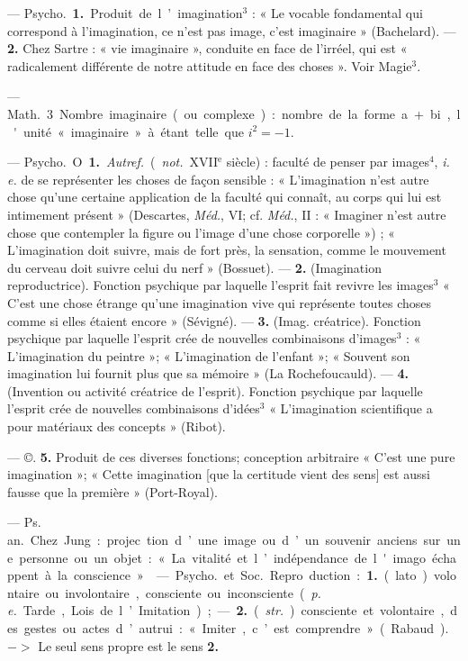 \begin{itemize}[leftmargin=1cm, label=, itemsep=1pt]
 — \si{Psycho.} {\bf 1.} Produit de
l’imagination$^3$ : « Le vocable fondamental qui correspond à l’imagination, ce n’est pas image, c’est imaginaire » (Bachelard). — {\bf 2.} Chez
Sartre : « vie imaginaire », conduite
en face de l’irréel, qui est « radicalement différente de notre attitude
en face des choses ». Voir Magie$^3$.

— \si{Math.} 3 Nombre imaginaire
(ou complexe) : nombre de la forme
a + bi, l'unité « imaginaire » à étant
telle que $i^2 = - 1$.

 — \si{Psycho.} O {\bf 1.} {\it Autref.}
({\it not.} {\footnotesize XVII}$^\text{e}$ siècle) : faculté de penser
par images$^4$, {\it i. e.} de se représenter
les choses de façon sensible : « L’imagination n’est autre chose qu’une certaine application de la faculté qui
connaît, au corps qui lui est intimement présent » (Descartes, \si{{\it Méd.}},
VI; cf. \si{{\it Méd.}}, II : « Imaginer n'est
autre chose que contempler la
figure ou l’image d’une chose corporelle ») ; « L’imagination doit suivre,
mais de fort près, la sensation,
comme le mouvement du cerveau
doit suivre celui du nerf » (Bossuet).
— {\bf 2.} (Imagination reproductrice).
Fonction psychique par laquelle
l'esprit fait revivre les images$^3$
« C’est une chose étrange qu’une
imagination vive qui représente
toutes choses comme si elles étaient
encore » (Sévigné). — {\bf 3.} (Imag.
créatrice). Fonction psychique par
laquelle l'esprit crée de nouvelles
combinaisons d'images$^3$ : « L’imagination du peintre »; « L’imagination
de l'enfant »; « Souvent son imagination lui fournit plus que sa mémoire »
(La Rochefoucauld). —
 {\bf 4.} (Invention ou activité créatrice
de l'esprit). Fonction psychique
par laquelle l'esprit crée de nouvelles combinaisons d’idées$^3$
« L’imagination scientifique a pour
matériaux des concepts » (Ribot).

— ©. {\bf 5.} Produit de ces diverses
fonctions; conception arbitraire
« C’est une pure imagination »;
« Cette imagination [que la certitude vient des sens] est aussi fausse
que la première » (Port-Royal).

 — \si{Ps. an.} Chez Jung : projec
tion d’une image ou d’un souvenir
anciens sur une personne ou un
objet : « La vitalité et l’indépendance de l'imago échappent à la
conscience. »

 — \si{Psycho.} et \si{Soc.} Repro
duction : {\bf 1.} (lato) volontaire ou involontaire, consciente ou inconsciente ({\it p. e.} Tarde, Lois de l’Imitation) ; — {\bf 2.} ({\it str.}) consciente et volontaire, des gestes ou actes d’autrui :
« Imiter, c’est comprendre » (Rabaud). $->$ Le seul sens propre est
le sens {\bf 2.}


\end{itemize}
